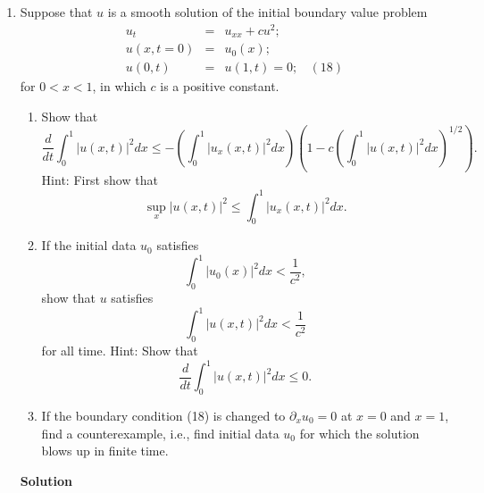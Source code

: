 \documentclass{article}
\begin{document}
\begin{enumerate}
\begin{enumerate}
\end{enumerate}



\item Suppose that \(u\) is a smooth solution of the initial boundary value problem
\begin{eqnarray*}
u_t & = & u_{xx} + c u^2; \\
u(x,t = 0) & = & u_0(x); \\
u(0,t) & = & u(1,t) = 0; \ \ \ \ (18)
\end{eqnarray*}
for \(0 < x < 1\), in which \(c\) is a positive constant.

\begin{enumerate}
\item Show that
\[\frac{d}{dt} \int_0^1 |u(x,t)|^2 dx \leq -\left( \int_0^1 |u_x(x,t)|^2 dx \right) \left( 1 - c \left( \int_0^1 |u(x,t)|^2 dx \right)^{1/2} \right).\]
Hint:  First show that
\[\sup_x |u(x,t)|^2 \leq \int_0^1 |u_x(x,t)|^2 dx.\]

\item If the initial data \(u_0\) satisfies
\[\int_0^1 |u_0(x)|^2 dx < \frac{1}{c^2},\]
show that \(u\) satisfies
\[\int_0^1 |u(x,t)|^2 dx < \frac{1}{c^2}\]
for all time.  Hint:  Show that
\[\frac{d}{dt} \int_0^1 |u(x,t)|^2 dx \leq 0.\]

\item If the boundary condition (18) is changed to \(\partial_x u_0 = 0\) at \(x = 0\) and \(x = 1\), find a counterexample, i.e., find initial data \(u_0\) for which the solution blows up in finite time.

\end{enumerate}

{\bf Solution}


\end{enumerate}
\end{document}
